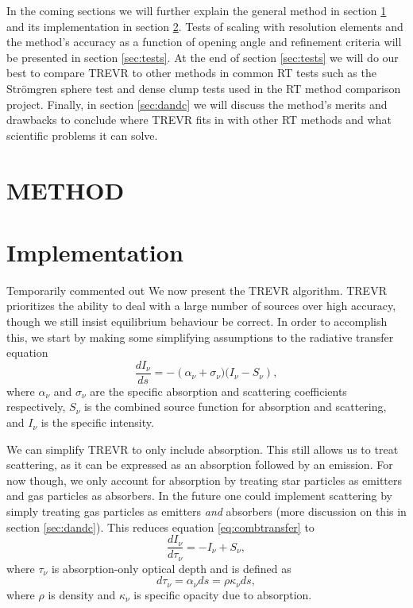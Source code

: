 \documentclass[fleqn,usenatbib]{mnras}
\newcommand{\acro}{TREVR}
\begin{document}
In the coming sections we will further explain the general method in section 
\ref{sec:method} and its implementation in section \ref{sec:implement}. Tests 
of scaling with resolution elements and the method's accuracy as a function of 
opening angle and refinement criteria will be presented in section 
\ref{sec:tests}. At the end of section \ref{sec:tests} we will do our best to 
compare \acro{} to other methods in common RT tests such as the Str\"{o}mgren
 sphere test and dense clump tests used in the \cite{ilievEt06} RT method 
comparison project. Finally, in section \ref{sec:dandc} we will discuss the 
method's merits and drawbacks to conclude where \acro{} fits in with other RT 
methods and what scientific problems it can solve.



\section{METHOD}\label{sec:method}
\section{Implementation}\label{sec:implement}
Temporarily commented out
We now present the \acro{} algorithm. \acro{} prioritizes the ability to deal 
with a large number of sources over high accuracy, though we still insist 
equilibrium behaviour be correct. In order to accomplish this, we start by 
making some simplifying assumptions to the radiative transfer equation
\begin{equation}
\label{eq:combtransfer}
\frac{dI_\nu}{ds} = -\left(\alpha_\nu + \sigma_\nu)(I_\nu - S_\nu\right),
\end{equation}
where $\alpha_\nu$ and $\sigma_\nu$ are the specific absorption and scattering 
coefficients respectively, $S_\nu$ is the combined source function for 
absorption and scattering, and $I_\nu$ is the specific intensity.

We can simplify \acro{} to only include absorption. This still allows us
to treat scattering, as it can be expressed as an absorption followed by an 
emission. For now though, we only account for absorption by treating star 
particles as emitters and gas particles as absorbers. In the future one could 
implement scattering by simply treating gas particles as emitters \textit{and}
absorbers (more discussion on this in section \ref{sec:dandc}). This reduces 
equation \ref{eq:combtransfer} to
\begin{equation}
\label{eq:absorbtransfer}
\frac{dI_\nu}{d\tau_\nu} = -I_\nu + S_\nu,
\end{equation}
where $\tau_\nu$ is absorption-only optical depth and is defined as
\begin{equation}
\label{eq:tau}
d\tau_\nu = \alpha_\nu ds = \rho \kappa_\nu ds,
\end{equation}
where $\rho$ is density and $\kappa_\nu$ is specific opacity due to absorption.
\end{document}
